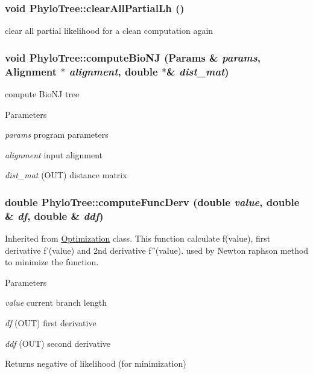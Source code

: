 \hypertarget{classPhyloTree_a1dc84a489c3471eff561658ab98a286a}{
\subsubsection[{clearAllPartialLh}]{\setlength{\rightskip}{0pt plus 5cm}void PhyloTree::clearAllPartialLh ()}}
\label{classPhyloTree_a1dc84a489c3471eff561658ab98a286a}
clear all partial likelihood for a clean computation again \hypertarget{classPhyloTree_a760299b108adf89646a22ab1ad195cda}{
\subsubsection[{computeBioNJ}]{\setlength{\rightskip}{0pt plus 5cm}void PhyloTree::computeBioNJ ({\bf Params} \& {\em params}, \/  {\bf Alignment} $\ast$ {\em alignment}, \/  double $\ast$\& {\em dist\_\-mat})}}
\label{classPhyloTree_a760299b108adf89646a22ab1ad195cda}
compute BioNJ tree 
\begin{DoxyParams}{Parameters}
\item[{\em params}]program parameters \item[{\em alignment}]input alignment \item[{\em dist\_\-mat}](OUT) distance matrix \end{DoxyParams}
\hypertarget{classPhyloTree_a9ae5f61aa0d22976b2d2e8f3ed15f44f}{
\subsubsection[{computeFuncDerv}]{\setlength{\rightskip}{0pt plus 5cm}double PhyloTree::computeFuncDerv (double {\em value}, \/  double \& {\em df}, \/  double \& {\em ddf})}}
\label{classPhyloTree_a9ae5f61aa0d22976b2d2e8f3ed15f44f}
Inherited from \hyperlink{classOptimization}{Optimization} class. This function calculate f(value), first derivative f'(value) and 2nd derivative f''(value). used by Newton raphson method to minimize the function. 
\begin{DoxyParams}{Parameters}
\item[{\em value}]current branch length \item[{\em df}](OUT) first derivative \item[{\em ddf}](OUT) second derivative \end{DoxyParams}
\begin{DoxyReturn}{Returns}
negative of likelihood (for minimization) 
\end{DoxyReturn}


